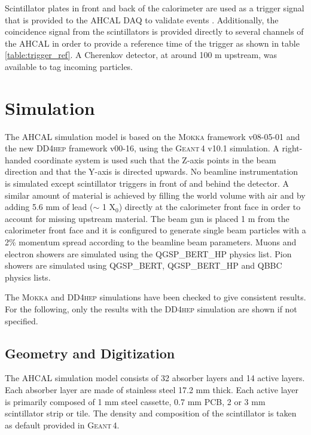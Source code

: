 \documentclass{JINST}
\newcommand\geant{\textsc{Geant\,4}\xspace}
\newcommand\mokka{\textsc{Mokka}\xspace}
\newcommand\ddhep{\textsc{DD4hep}\xspace}
\begin{document}
Scintillator plates in front and back of the calorimeter are used as a trigger signal that is provided to the AHCAL DAQ to validate events \cite{Kvasnicka:CR_IEEE2016}. Additionally, the coincidence signal from the scintillators is provided directly to several channels of the AHCAL in order to provide a reference time of the trigger as shown in table \ref{table:trigger_ref}. A Cherenkov detector, at around 100 m upstream, was available to tag incoming particles.

\section{Simulation}

The AHCAL simulation model is based on the \mokka \cite{MoradeFreitas:2002kj} framework v08-05-01 and the new \ddhep \cite{Frank:2014zya} framework v00-16, using the \geant v10.1 simulation. A right-handed coordinate system is used such that the Z-axis points in the beam direction and that the Y-axis is directed upwards. No beamline instrumentation is simulated except scintillator triggers in front of and behind the detector. A similar amount of material is achieved by filling the world volume with air and by adding 5.6 mm of lead ($\sim$ 1 X$_0$) directly at the calorimeter front face in order to account for missing upstream material. The beam gun is placed 1 m from the calorimeter front face and it is configured to generate single beam particles with a 2\% momentum spread according to the beamline beam parameters. Muons and electron showers are simulated using the QGSP\_BERT\_HP physics list. Pion showers are simulated using QGSP\_BERT, QGSP\_BERT\_HP and QBBC physics lists.

The \mokka and \ddhep simulations have been checked to give consistent results. For the following, only the results with the \ddhep simulation are shown if not specified.

\subsection{Geometry and Digitization}
\label{sec:GeoDigi}

The AHCAL simulation model consists of 32 absorber layers and 14 active layers. Each absorber layer are made of stainless steel 17.2 mm thick. Each active layer is primarily composed of 1 mm steel cassette, 0.7 mm PCB, 2 or 3 mm scintillator strip or tile. The density and composition of the scintillator is taken as default provided in \geant.
\end{document}
